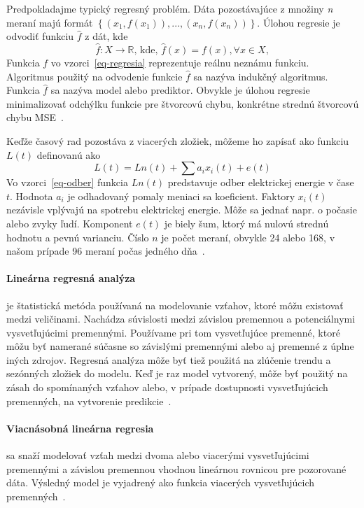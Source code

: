 \documentclass[a4paper,slovak,12pt,appendix]{article}
\begin{document}
Predpokladajme typický regresný problém. Dáta pozostávajúce z množiny \textit{n}
meraní majú formát $\left\{(x_1, f(x_1)), ..., (x_n, f(x_n))\right\}$.
Úlohou regresie je odvodiť funkciu $\hat{f}$ z dát, kde
\begin{equation}
  \hat{f} : X \to \mathbb{R} \text{, kde, } \hat{f}(x) = f(x), \forall x \in X,
  \label{eq-regresia}
\end{equation}
Funkcia $f$ vo vzorci~\ref{eq-regresia} reprezentuje reálnu neznámu
funkciu. Algoritmus použitý na odvodenie funkcie $\hat{f}$ sa nazýva
indukčný algoritmus. Funkcia $\hat{f}$ sa nazýva model alebo
prediktor. Obvykle je úlohou regresie minimalizovať odchýlku funkcie pre
štvorcovú chybu, konkrétne strednú štvorcovú chybu MSE~\cite{Mendes-Moreira2012}.

Keďže časový rad pozostáva z viacerých zložiek, môžeme ho zapísať ako funkciu
$L(t)$ definovanú ako
\begin{equation}
  L(t) = Ln(t) + \sum a_i x_i(t) + e(t)
  \label{eq-odber}
\end{equation}
Vo vzorci~\ref{eq-odber} funkcia $Ln(t)$ predstavuje odber elektrickej energie
v čase $t$. Hodnota $a_i$ je odhadovaný pomaly meniaci sa koeficient. Faktory
$x_i(t)$ nezávisle vplývajú na spotrebu elektrickej energie. Môže sa jednať
napr. o počasie alebo zvyky ľudí. Komponent $e(t)$ je biely šum, ktorý má nulovú
strednú hodnotu a pevnú varianciu. Číslo $n$ je počet meraní, obvykle 24
alebo 168, v našom prípade 96 meraní počas jedného dňa~\cite{KumarSingh2013}.

\paragraph{Lineárna regresná analýza} je štatistická metóda používaná na
modelovanie vzťahov, ktoré môžu existovať medzi veličinami. Nachádza súvislosti
medzi závislou premennou a potenciálnymi vysvetľujúcimi premennými. Používame
pri tom vysvetľujúce premenné, ktoré môžu byť namerané súčasne so závislými
premennými alebo aj premenné z úplne iných zdrojov. Regresná analýza môže byť
tiež použitá na zlúčenie trendu a sezónných zložiek do modelu. Keď je raz model
vytvorený, môže byť použitý na zásah do spomínaných vzťahov alebo, v prípade
dostupnosti vysvetľujúcich premenných, na vytvorenie predikcie~\cite{Liu1992}.

\paragraph{Viacnásobná lineárna regresia} sa snaží modelovať vzťah medzi dvoma
alebo viacerými vysvetľujúcimi premennými a závislou premennou vhodnou
lineárnou rovnicou pre pozorované dáta. Výsledný model je vyjadrený ako funkcia
viacerých vysvetľujúcich premenných~\cite{Grmanova2016}.
\end{document}
